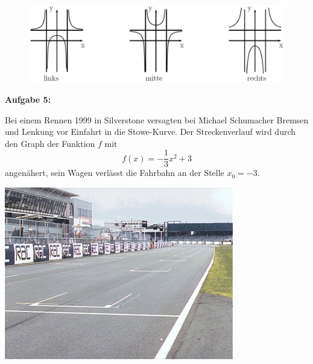 \documentclass[a4paper,12pt]{article}
\newcommand{\Aufgabe}[1]{
  {
  \vspace*{0.5cm}
  \textsf{\textbf{Aufgabe #1}}
  \vspace*{0.2cm}
  
  }
}
\begin{document}
\begin{figure}[h!]
  \begin{center}
    \includegraphics[width=0.7 \linewidth]{Q11_1KlausurJanuar2022_2.png}
  \end{center}
\end{figure}


\Aufgabe{5:}

\noindent
\begin{minipage}{0.6\textwidth}%
Bei einem Rennen 1999 in Silverstone versagten bei Michael Schumacher Bremsen und Lenkung vor Einfahrt in die Stowe-Kurve. Der Streckenverlauf wird durch den Graph der Funktion $f$ mit
\[f(x)=-\frac{1}{3}x^2+3 \]
angenähert, sein Wagen verlässt die Fahrbahn an der Stelle $x_0 = -3$.
\end{minipage}
\hfill%
\begin{minipage}{0.3\textwidth}%
\includegraphics[width=\linewidth]{Q11_1KlausurJanuar2022_3.png}
\end{minipage}%


\end{document}
